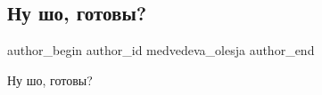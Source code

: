  
 
 
 
 
 
\subsection{Ну шо, готовы?}
\label{sec:07_12_2021.fb.medvedeva_olesja.1.nu_sho_gotovy}
 
\ifcmt
 author_begin
   author_id medvedeva_olesja
 author_end
\fi

Ну шо, готовы?

